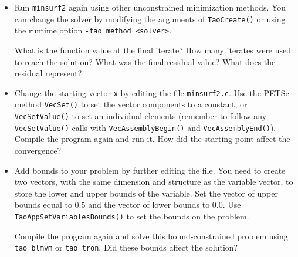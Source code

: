 \documentclass[11pt]{article}
\begin{document}
\begin{enumerate}
\begin{itemize}
  \item 
  Run \texttt{minsurf2} again using other unconstrained minimization 
  methods.    You can change the solver by modifying the arguments of 
  \texttt{TaoCreate()} or using the runtime option \texttt{-tao\_method <solver>}.
 
  What is the function value at the final iterate?
  How many iterates were used to reach
  the solution?  What was the final residual value? What does the residual represent?

 \item 
  Change the starting vector \texttt{x} by editing the file \texttt{minsurf2.c}.  
  Use the PETSc method {\tt VecSet()}
  to set the vector components to a constant, or {\tt VecSetValue()} to set 
  an individual elements (remember to follow any {\tt VecSetValue()} calls
  with {\tt VecAssemblyBegin()} and {\tt VecAssemblyEnd()}).  Compile the program again and run it.
  How did the starting point affect the convergence?

 \item
  Add bounds to your problem by further editing the file. You need to create two vectors, with the
  same dimension and structure as the variable vector, to store the
  lower and upper bounds of the variable.  Set the vector of upper
  bounds equal to $0.5$ and the vector of lower bounds to $0.0$.  Use
  {\tt TaoAppSetVariablesBounds()} to set the bounds on the problem.  

  Compile the program again and solve this bound-constrained problem using  \texttt{tao\_blmvm} or 
  \texttt{tao\_tron}. Did these bounds affect the solution? 
\end{itemize}

\end{enumerate}
\end{document}
